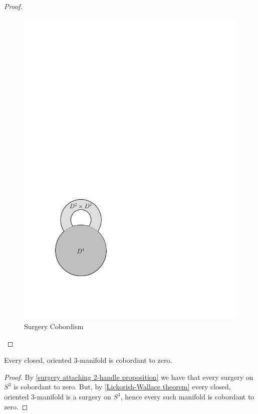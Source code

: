 \begin{proof}
\begin{figure}[tb]
\centering
\includegraphics[scale=.6]{graphics/surgery-cobordism-ball}
\caption{Surgery Cobordism}
\label{surgery-cobordism-ball}
\end{figure}
\end{proof}


\begin{cor}
Every closed, oriented 3-manifold is cobordant to zero.
\end{cor}
\begin{proof}
By \cref{surgery attaching 2-handle proposition} we have that every surgery on $S^3$ is cobordant to zero. But, by \cref{Lickorish-Wallace theorem} every closed, oriented 3-manifold is a surgery on $S^3$, hence every such manifold is cobordant to zero.
\end{proof}

